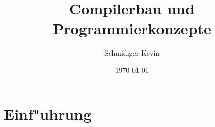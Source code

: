 \documentclass[11pt, oneside]{article}   	%
\title{Compilerbau und Programmierkonzepte}
\author{Schmidiger Kevin}
\date{\today}						%
\begin{document}
\maketitle
\newpage

\tableofcontents
\newpage

\section{Einf"uhrung}
\end{document}
